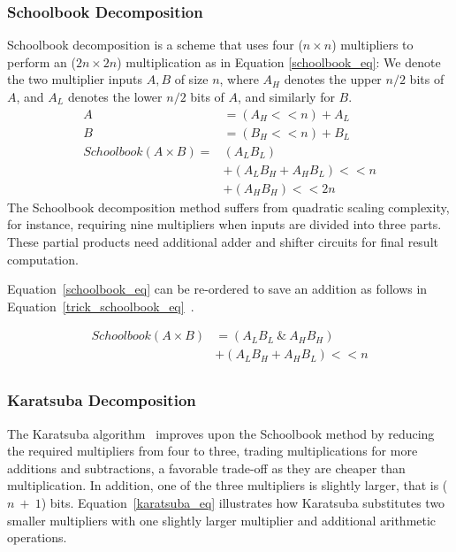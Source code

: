 \documentclass[conference]{IEEEtran}
\begin{document}
\subsubsection{Schoolbook Decomposition}
Schoolbook decomposition is a scheme that uses four ($n \times n$) multipliers to perform an ($2n \times 2n$) multiplication as in Equation \ref{schoolbook_eq}:
We denote the two multiplier inputs $A, B$ of size $n$, where $A_H$ denotes the upper $n/2$ bits of $A$, and $A_L$ denotes the lower $n/2$ bits of $A$, and similarly for $B$. 
\begin{equation} \label{schoolbook_eq}
\begin{split}
    A &= (A_H << n) + A_L\\
    B&= (B_H<<n) + B_L\\
    \mathit{Schoolbook}(A \times B) = & (A_L B_L) \\
                &+ (A_L B_H + A_H  B_L) << n \\
                &+ (A_H  B_H) << 2n
\end{split}
\end{equation}
The Schoolbook decomposition method suffers from quadratic scaling complexity, for instance, requiring nine multipliers when inputs are divided into three parts. 
These partial products need additional adder and shifter circuits for final result computation.

Equation~\ref{schoolbook_eq} can be re-ordered to save an addition as follows in Equation~\ref{trick_schoolbook_eq}~\cite{zhangIMpressLargeInteger2022}. 

\begin{equation} \label{trick_schoolbook_eq}
\begin{split}
    \mathit{Schoolbook}(A\times B) &= (A_L  B_L\ \&\ A_H B_H) \\
                &+ (A_L  B_H + A_H  B_L) << n \\
\end{split}
\end{equation}

\subsubsection{Karatsuba Decomposition}
The Karatsuba algorithm~\cite{karatsubaOriginalPaper} improves upon the Schoolbook method by reducing the required multipliers from four to three, trading multiplications for more additions and subtractions, a favorable trade-off as they are cheaper than multiplication.
In addition, one of the three multipliers is slightly larger, that is ($n\ +\ 1$) bits. 
Equation~\ref{karatsuba_eq} illustrates how Karatsuba substitutes two smaller multipliers with one slightly larger multiplier and additional arithmetic operations.
\end{document}
